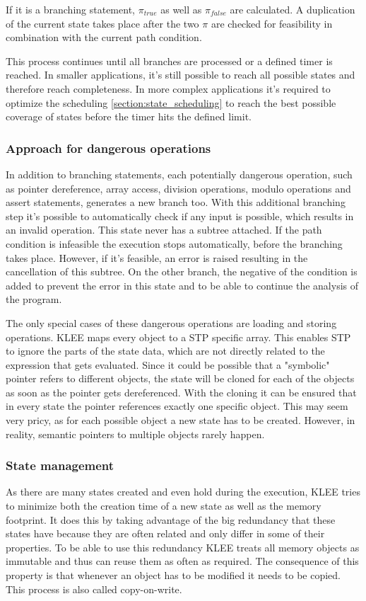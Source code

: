 If it is a branching statement, $\pi_{true}$ as well as $\pi_{false}$ are calculated. A duplication of the current state takes place after the two $\pi$ are checked for feasibility in combination with the current path condition.

This process continues until all branches are processed or a defined timer is reached. In smaller applications, it's still possible to reach all possible states and therefore reach completeness. In more complex applications it's required to optimize the scheduling \ref{section:state_scheduling} to reach the best possible coverage of states before the timer hits the defined limit.
\subsubsection{Approach for dangerous operations}\label{section:dangerous_operations}
In addition to branching statements, each potentially dangerous operation, such as pointer dereference, array access, division operations, modulo operations and assert statements, generates a new branch too. With this additional branching step it's possible to automatically check if any input is possible, which results in an invalid operation. This state never has a subtree attached. If the path condition is infeasible the execution stops automatically, before the branching takes place. However, if it's feasible, an error is raised resulting in the cancellation of this subtree. On the other branch, the negative of the condition is added to prevent the error in this state and to be able to continue the analysis of the program.

The only special cases of these dangerous operations are loading and storing operations. KLEE maps every object to a STP specific array. This enables STP to ignore the parts of the state data, which are not directly related to the expression that gets evaluated. Since it could be possible that a "symbolic" pointer refers to different objects, the state will be cloned for each of the objects as soon as the pointer gets dereferenced. With the cloning it can be ensured that in every state the pointer references exactly one specific object. This may seem very pricy, as for each possible object a new state has to be created. However, in reality, semantic pointers to multiple objects rarely happen. 

\subsubsection{State management}
As there are many states created and even hold during the execution, KLEE tries to minimize both the creation time of a new state as well as the memory footprint. It does this by taking advantage of the big redundancy that these states have because they are often related and only differ in some of their properties. To be able to use this redundancy KLEE treats all memory objects as immutable and thus can reuse them as often as required. The consequence of this property is that whenever an object has to be modified it needs to be copied. This process is also called copy-on-write.

